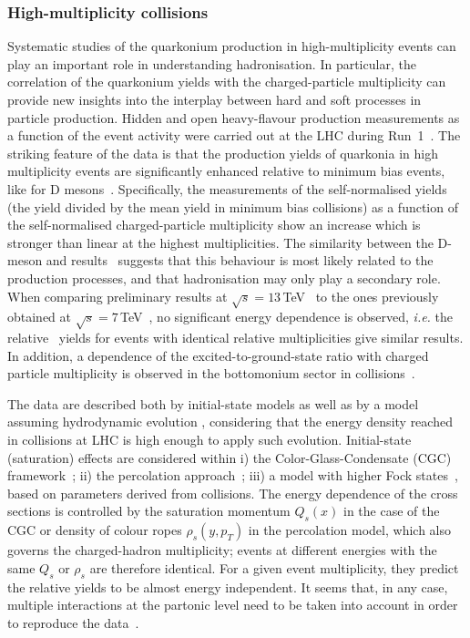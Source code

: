 \documentclass[../report.tex]{subfiles}
\begin{document}
\subsubsection{High-multiplicity \pp collisions} %

Systematic studies of the quarkonium production in high-multiplicity \pp events can play an important role in understanding hadronisation.
In particular, the correlation of the quarkonium yields with the charged-particle multiplicity can provide new insights into the interplay between hard and soft processes in particle production.
Hidden and open heavy-flavour production measurements as a function of the event activity were carried out  at the LHC during Run~1~\cite{Abelev:2012rz,Chatrchyan:2013nza}.
The striking feature of the data is that the production yields of quarkonia in high multiplicity events are significantly enhanced relative to minimum bias events, like for D mesons~\cite{Adam:2015ota}.
Specifically, the measurements of the self-normalised yields (the yield divided by the mean yield in minimum bias collisions) as a function of the self-normalised charged-particle multiplicity show an increase which is stronger than linear at the highest multiplicities.
The similarity between the D-meson and \PJgy results~\cite{Abelev:2012rz,Adam:2015ota} suggests that this behaviour is most likely related to the production processes, and that hadronisation may only play a secondary role.
When comparing \PJgy preliminary results at $\sqrt{s}=13$\,TeV~\cite{Weber:2017hhm} to the ones previously obtained at $\sqrt{s} = 7$\,TeV~\cite{Abelev:2012rz}, no significant energy dependence is observed, {\it i.e.} the relative \PJgy~yields for events with identical relative multiplicities give similar results. In addition, a dependence of the excited-to-ground-state ratio with charged particle multiplicity is observed in the bottomonium sector in \pp collisions~\cite{Chatrchyan:2013nza,CMS-PAS-BPH-14-009}.

The data are described both by initial-state models as well as by a model assuming hydrodynamic evolution \cite{Werner:2013tya}, considering that the energy density reached in \pp collisions at LHC is high enough to apply such evolution.
Initial-state (saturation) effects are considered within
i) the Color-Glass-Condensate (CGC) framework~\cite{Ma:2018bax}; ii) the percolation approach~\cite{Ferreiro:2012fb,Ferreiro:2015gea}; iii) a model with higher Fock states~\cite{Kopeliovich:2013yfa}, based on parameters derived from \pPb collisions.
The energy dependence of the cross sections is controlled by the saturation momentum $Q_s(x)$ in the case of the CGC or density of colour ropes $\rho_s(y,p_T)$ in the percolation model, which also governs the charged-hadron multiplicity; events at different energies with the same $Q_s$ or $\rho_s$ are therefore identical.
For a given event multiplicity, they predict the relative yields to be almost energy independent.
It seems that, in any case, multiple interactions at the partonic level need to be taken into account in order to reproduce the data~\cite{Sjostrand:2014zea,Skands:2014pea,Sjostrand:2017cdm}.
\end{document}
